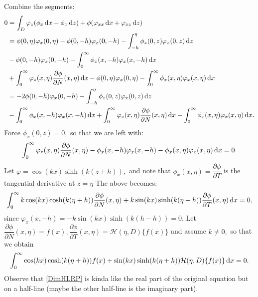 \documentclass[10pt,reqno,oneside,a4paper]{article}
\begin{document}
Combine the segments:
\begin{align*}
0 &= \int_D \varphi_z(\phi_x \,\mathrm{d} x - \phi_x \,\mathrm{d} z) + \phi(\varphi_{xx} \,\mathrm{d} x + \varphi_{xz} \,\mathrm{d} z) \\
&=  \phi(0, \eta) \varphi_x(0, \eta) - \phi(0, -h) \varphi_x(0, -h) - \int_{-h}^{\eta} \phi_{z}(0,z) \varphi_{x}(0,z) \,\mathrm{d} z \\
&- \phi(0,-h) \varphi_{x}(0,-h) - \int^{\infty}_{0} \phi_x(x,-h) \varphi_x(x,-h) \,\mathrm{d} x \\
&+ \int_{0}^{\infty} \varphi_z(x, \eta)\frac{\partial \phi}{\partial N}(x, \eta)\,\mathrm{d} x - \phi(0, \eta) \varphi_x(0, \eta) - \int^{\infty}_{0}\phi_x(x, \eta)  \varphi_x(x, \eta) \,\mathrm{d} x \\
&= - 2\phi(0,-h) \varphi_{x}(0,-h) - \int_{-h}^{\eta} \phi_{z}(0,z) \varphi_{x}(0,z) \,\mathrm{d} z \\
& - \int^{\infty}_{0} \phi_x(x,-h) \varphi_x(x,-h) \,\mathrm{d} x + \int_{0}^{\infty} \varphi_z(x, \eta)\frac{\partial \phi}{\partial N}(x, \eta)\,\mathrm{d} x - \int^{\infty}_{0}\phi_x(x, \eta)  \varphi_x(x, \eta) \,\mathrm{d} x. 
\end{align*}
Force $\phi_x(0,z) = 0,$ so that we are left with:
\begin{equation}
\int_{0}^{\infty} \varphi_z(x, \eta)\frac{\partial \phi}{\partial N}(x, \eta) - \phi_x(x,-h) \varphi_x(x,-h) - \phi_x(x, \eta) \varphi_x(x, \eta) \,\mathrm{d} x = 0.
\end{equation}
Let $\varphi = \cos(kx) \sinh(k(z+h)),$ and note that $\phi_x(x, \eta) = \dfrac{\partial \phi}{\partial T}$ is the tangential derivative at $z = \eta$ The above becomes:
\begin{equation}
\int_{0}^{\infty} k \cos(kx) \cosh(k(\eta+h)) \frac{\partial \phi}{\partial N}(x, \eta) + k \sin(kx) \sinh(k(\eta+h)) \dfrac{\partial \phi}{\partial T}(x, \eta) \,\mathrm{d} x = 0,
\end{equation}
since $\varphi_x(x,-h) = -k \sin(kx) \sinh(k(h-h)) = 0.$ Let $\dfrac{\partial \phi}{\partial N}(x, \eta) = f(x), \dfrac{\partial \phi}{\partial T}(x, \eta) = \mathcal{H}(\eta,D)\{ f(x) \}$ and assume $k \neq 0,$ so that we obtain
\begin{equation}\label{DimHLRP}
\int_{0}^{\infty} \cos(kx) \cosh(k(\eta+h)) f(x) + \sin(kx) \sinh(k(\eta+h))\mathcal{H}(\eta,D) \{f(x) \} \,\mathrm{d} x = 0.
\end{equation}
Observe that \eqref{DimHLRP} is kinda like the real part of the original equation but on a half-line (maybe the other half-line is the imaginary part).
\end{document}
